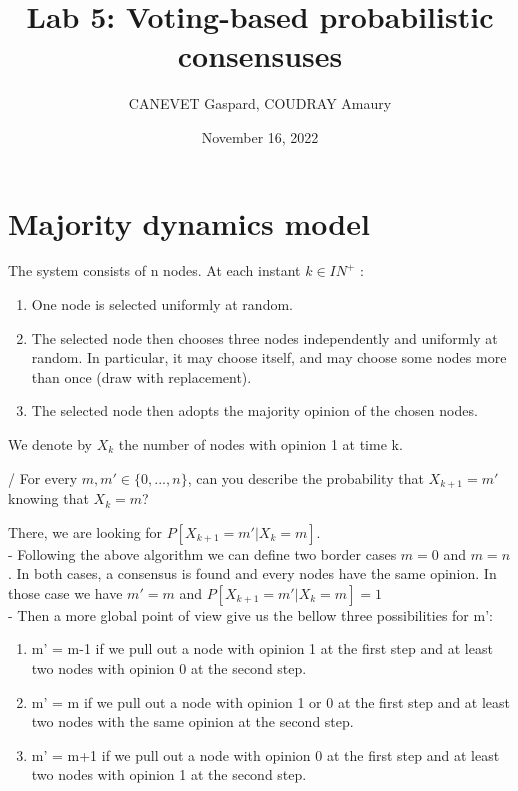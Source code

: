 \documentclass[11pt]{article}
\title{Lab 5: Voting-based probabilistic consensuses}
\author{CANEVET Gaspard, COUDRAY Amaury}
\date{November 16, 2022}
\begin{document}
\maketitle	

\vspace{10mm}



\section{Majority dynamics model}

The system consists of n nodes. At each instant $k \in IN^{+}$ :
\begin{enumerate}
    \item One node is selected uniformly at random.
    \item The selected node then chooses three nodes independently and uniformly at random. In particular, it may choose itself, and may choose some nodes more than once (draw with replacement).
    \item The selected node then adopts the majority opinion of the chosen nodes.
\end{enumerate}

\noindent We denote by $X_{k}$ the number of nodes with opinion 1 at time k.

\vspace{5mm}

/ For every $m, m' \in \{0, . . . , n\}$, can you describe the probability that $X_{k+1} = m'$ knowing that $X_{k} = m$? 

\vspace{5mm}

\noindent There, we are looking for $P[X_{k+1} = m'|X_{k} = m]$. \\
- Following the above algorithm we can define two border cases $m=0$ and $m=n$. In both cases, a consensus is found and every nodes have the same opinion.
In those case we have $m'=m$ and $P[X_{k+1} = m'|X_{k} = m] = 1$ \\
- Then a more global point of view give us the bellow three possibilities for m': 
\begin{enumerate}[topsep=0pt, itemsep=0pt]
    \item m' = m-1 if we pull out a node with opinion 1 at the first step and at least two nodes with opinion 0 at the second step.
    \item m' = m if we pull out a node with opinion 1 or 0 at the first step and at least two nodes with the same opinion at the second step.
    \item m' = m+1 if we pull out a node with opinion 0 at the first step and at least two nodes with opinion 1 at the second step.
\end{enumerate}
\end{document}
